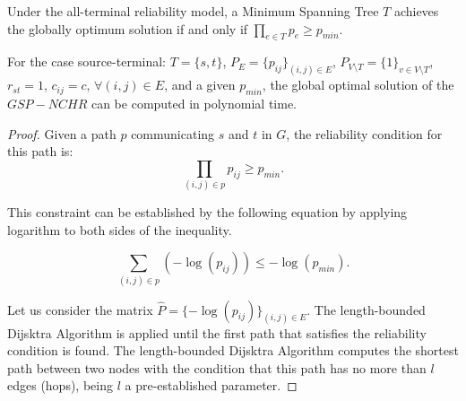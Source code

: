 \begin{proposition}
Under the all-terminal reliability model, a Minimum Spanning Tree $T$ achieves the globally optimum solution if and only if 
$\prod_{e\in T}p_e \geq p_{min}$.
\end{proposition}

\begin{proposition} For the case source-terminal: $T=\{s,t\}$, $P_{E}=\{p_{ij}\}_{(i,j)\in
E}$, $P_{V\setminus T}=\{1\}_{v\in V\setminus T}$, $r_{st}=1$,
$c_{ij}=c,\,\forall (i,j)\in E$, and a given $p_{min}$, the global
optimal solution of the $GSP-NCHR$ can be computed in polynomial
time.
\end{proposition}
\begin{proof} Given a path $p$ communicating $s$ and $t$ in $G$, the
reliability condition for this path is: \[\prod_{(i,j)\in p}
p_{ij}\geq p_{min}.
\]

This constraint can be established by the following equation by
applying logarithm to both sides of the inequality.

\[\sum_{(i,j)\in p} (-\log(p_{ij}))\leq -\log(p_{min}). \]

Let us consider the matrix $\hat{P}=\{-\log(p_{ij})\}_{(i,j)\in
E}$. The length-bounded Dijsktra Algorithm is applied until the
first path that satisfies the reliability condition is found. The
length-bounded Dijsktra Algorithm computes the shortest path
between two nodes with the condition that this path has no more
than $l$ edges (hops), being $l$ a pre-established parameter.


\end{proof}
